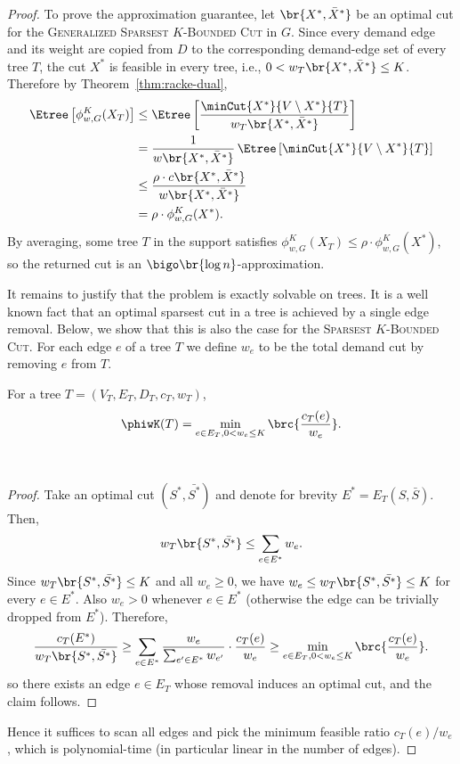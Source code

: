 \begin{proof}
To prove the approximation guarantee, let $\br{X^*,\bar{X}^*}$ be an optimal cut for the \textsc{Generalized Sparsest $K$-Bounded Cut} in $G$.
Since every demand edge and its weight are copied from $D$ to the corresponding demand-edge set of every tree $T$, the cut $X^*$ is feasible in every tree, i.e., $0<w_{T}\br{X^*,\bar{X}^*}\le K$.
Therefore by Theorem~\ref{thm:racke-dual},
\begin{align*}
  \Etree\left[\phi_{w,G}^K(X_{T})\right]
  &\leq
  \Etree\left[\frac{\minCut{X^*}{V\setminus X^*}{T}}{w_T\br{X^*,\bar{X}^*}}\right]
  \\&=
  \frac{1}{w\br{X^*,\bar{X}^*}}\,\Etree\left[\minCut{X^*}{V\setminus X^*}{T}\right]
  \\&\leq
  \frac{\rho\cdot c\br{X^*,\bar{X}^*}}{w\br{X^*,\bar{X}^*}}
  \\&=
  \rho\cdot\phi_{w,G}^K(X^*).
\end{align*}
By averaging, some tree $T$ in the support satisfies
$\phi_{w,G}^K(X_{T})\le \rho\cdot \phi_{w,G}^K(X^*)$, so the returned cut is an $\bigo\br{\log n}$-approximation.

It remains to justify that the problem is exactly solvable on trees.
It is a well known fact that an optimal sparsest cut in a tree is achieved by a single edge removal.
Below, we show that this is also the case for the \textsc{Sparsest $K$-Bounded Cut}.
For each edge $e$ of a tree $T$ we define $w_e$ to be the total demand cut by removing $e$ from $T$.
\begin{lemma}
For a tree $T=(V_T,E_T,D_T,c_T,w_T)$,
\[
  \phiwK(T)
  =
  \min_{e\in E_T, 0<w_e\le K} \brc{\frac{c_T(e)}{w_e}}.
\]
\end{lemma}\
\begin{proof}
Take an optimal cut $(S^*,\bar{S^*})$ and denote for brevity $E^*=E_T(S,\bar{S})$.
Then,
\[
  w_T\br{S^*,\bar{S^*}} \leq \sum_{e\in E^*} w_e.
\]
Since $w_T\br{S^*,\bar{S^*}}\le K$ and all $w_e\ge 0$, we have
$w_e\le w_T\br{S^*,\bar{S^*}}\le K$ for every $e\in E^*$.
Also $w_e>0$ whenever $e\in E^*$ (otherwise the edge can be trivially dropped from $E^*$).
Therefore,
\[
  \frac{c_T(E^*)}{w_T\br{S^*,\bar{S^*}}}
  \geq
  \sum_{e\in E^*} \frac{w_e}{\sum_{e'\in E^*}w_{e'}}\cdot\frac{c_T(e)}{w_e}
  \geq
  \min_{e\in E_T, 0<w_e\le K} \brc{\frac{c_T(e)}{w_e}}.
\]
so there exists an edge $e\in E_T$ whose removal induces an optimal cut, and the claim follows.
\end{proof}
Hence it suffices to scan all edges and pick the minimum feasible ratio $c_T(e)/w_e$, which is polynomial-time (in particular linear in the number of edges).
\end{proof}


